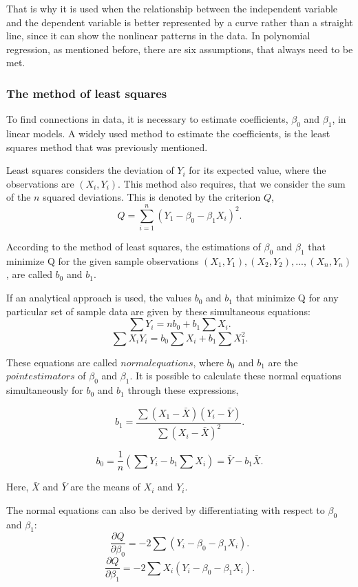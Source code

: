 \noindent That is why it is used when the relationship between the independent variable and the dependent variable is better represented by a curve rather than a straight line, since it can show the nonlinear patterns in the data.
In polynomial regression, as mentioned before, there are six assumptions, that always need to be met.


\subsubsection{The method of least squares}
To find connections in data, it is necessary to estimate coefficients, $\beta_0$ and $\beta_1$, in linear models. 
A widely used method to estimate the coefficients, is the least squares method that was previously mentioned. 

\noindent Least squares considers the deviation of $Y_i$ for  its expected value, where the observations are $(X_i, Y_i)$. 
This method also requires, that we consider the sum of the $n$ squared deviations.
This is denoted by the criterion $Q$,
$$Q=\sum_{i=1}^{n}(Y_1-\beta_0 - \beta_1 X_i)^2 .$$
 
\noindent According to the method of least squares, the estimations of $\beta_0$ and $\beta_1$ that minimize Q for the given sample observations $(X_1,Y_1), (X_2,Y_2), ..., (X_n,Y_n)$, are called $b_0$ and $b_1$.  

\noindent If an analytical approach is used, the values $b_0$ and $b_1$ that minimize Q for any particular set of sample data are given by these simultaneous equations: 
$$\sum Y_i =n b_0 +b_1 \sum X_i .$$
$$\sum X_i Y_i = b_0 \sum X_i + b_1 \sum X_1^2 .$$

\noindent These equations are called $normal equations$, where $b_0$ and $b_1$ are the $point estimators$ of $\beta_0$ and $\beta_1$. It is possible to calculate these normal equations simultaneously for $b_0$ and $b_1$ through these expressions,

$$b_1 = \frac{\sum (X_1 - \bar{X}) (Y_i - \bar{Y})}{\sum (X_i - \bar{X})^2} .$$

$$b_0 = \frac{1}{n} (\sum Y_i - b_1 \sum X_i ) = \bar{Y} - b_1 \bar{X} .$$

\noindent Here, $\bar{X}$ and $\bar{Y}$ are the means of $X_i$ and $Y_i$.

\noindent The normal equations can also be derived by differentiating with respect to $\beta_0$ and $\beta_1$:
$$\frac{\partial Q}{\partial \beta_0}=-2 \sum (Y_i - \beta_0 - \beta_1 X_i) .$$
$$\frac{\partial Q} {\partial \beta_1} = -2 \sum X_i (Y_i - \beta_0 - \beta_1 X_i) .$$

